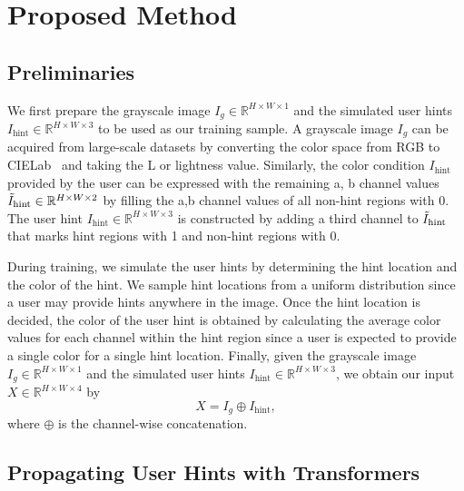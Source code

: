 \documentclass[10pt,twocolumn,letterpaper]{article}
\begin{document}
\vspace{-0.2cm}
\section{Proposed Method}

\vspace{-0.1cm}
\subsection{Preliminaries}

We first prepare the grayscale image $I_g\in \mathbb{R}^{H\times W \times 1}$ and the simulated user hints $I_{\text{hint}}\in \mathbb{R}^{H\times W \times 3}$ to be used as our training sample. 
A grayscale image $I_g$ can be acquired from large-scale datasets by converting the color space from RGB to CIELab~\cite{cie} and taking the L or lightness value. 
Similarly, the color condition $I_{\text{hint}}$ provided by the user can be expressed with the remaining a, b channel values $\Tilde{I}_{\text{hint}} \in \mathbb{R}^{H\times W \times 2}$ by filling the a,b channel values of all non-hint regions with 0. 
The user hint $I_{\text{hint}}\in \mathbb{R}^{H\times W \times 3}$ is constructed by adding a third channel to $\Tilde{I}_{\text{hint}}$ that marks hint regions with 1 and non-hint regions with 0. 

During training, we simulate the user hints by determining the hint location and the color of the hint. 
We sample hint locations from a uniform distribution since a user may provide hints anywhere in the image. 
Once the hint location is decided, the color of the user hint is obtained by calculating the average color values for each channel within the hint region since a user is expected to provide a single color for a single hint location. 
Finally, given the grayscale image $I_g\in \mathbb{R}^{H\times W \times 1}$ and the simulated user hints $I_{\text{hint}}\in \mathbb{R}^{H\times W \times 3}$, we obtain our input $X\in \mathbb{R}^{H\times W \times 4}$ by
\begin{equation*}
    X = I_g \oplus I_{\text{hint}},
\end{equation*}
where $\oplus$ is the channel-wise concatenation. 

\subsection{Propagating User Hints with Transformers}
\end{document}
